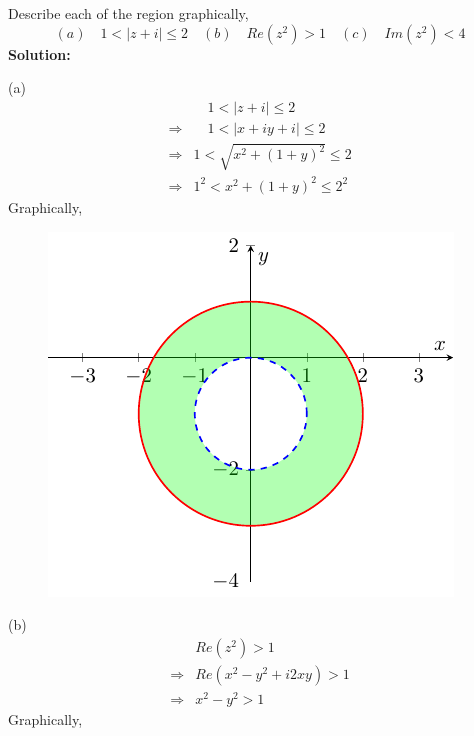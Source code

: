 \begin{ex}
\begin{figure}[ht!]
        \label{fig 10}
    \end{figure}
    \FloatBarrier
\end{ex}

\begin{ex}
    Describe each of the region graphically, 
    $$(a)\quad 1<\mid z+i \mid \leq 2 \quad (b)  \quad Re(z^2)>1 \quad (c) \quad Im(z^2)<4$$
    \noindent \textbf{Solution:} \par 
    \noindent (a) \begin{align*}
        & \quad 1<\mid z+i \mid \leq 2\\
        \Rightarrow & \quad 1<\mid x+iy+i \mid \leq 2\\
        \Rightarrow & 1<\sqrt{x^2+(1+y)^2} \leq 2 \\
        \Rightarrow & 1^2 < x^2+(1+y)^2 \leq 2^2
    \end{align*}
    Graphically, \begin{figure}[ht!]
        \centering
        \includegraphics{FIG_MAT215/FIG11.pdf}
        \label{fig 11}
    \end{figure}
    \FloatBarrier
    \noindent (b) \begin{align*}
        & Re(z^2) > 1\\
        \Rightarrow & Re(x^2-y^2+i2xy)>1 \\
        \Rightarrow & x^2-y^2 >1
    \end{align*}
    Graphically, \begin{figure}[ht!]
        \centering

\end{figure}
\end{ex}
